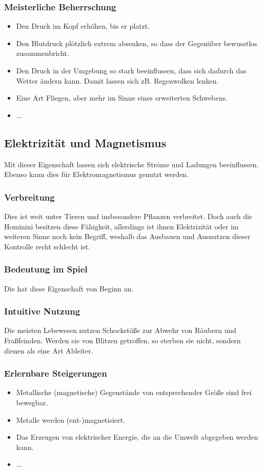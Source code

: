 \subsubsection{Meisterliche Beherrschung} 
\begin{itemize}
	\item Den Druck im Kopf erhöhen, bis er platzt.
	\item Den Blutdruck plötzlich extrem absenken, so dass der Gegenüber bewusstlos zusammenbricht. 
	\item Den Druck in der Umgebung so stark beeinflussen, dass sich dadurch das Wetter ändern kann. Damit lassen sich zB. Regenwolken lenken. 
	\item Eine Art Fliegen, aber mehr im Sinne eines erweiterten Schwebens.
	\item ...
\end{itemize}



\subsection{Elektrizität und Magnetismus}\label{sec:elektromagie}
Mit dieser Eigenschaft lassen sich elektrische Ströme und Ladungen beeinflussen. Ebenso kann dies für Elektromagnetismus genutzt werden.

\subsubsection{Verbreitung}
Dies ist weit unter Tieren und insbesondere Pflanzen verbreitet. Doch auch die Hominini besitzen diese Fähigkeit, allerdings ist ihnen Elektrizität oder im weiteren Sinne noch kein Begriff, weshalb das Ausbauen und Ausnutzen dieser Kontrolle recht schlecht ist.

\subsubsection{Bedeutung im Spiel}
Die  hat diese Eigenschaft von Beginn an. 

\subsubsection{Intuitive Nutzung}
Die meisten Lebewesen nutzen Schockstöße zur Abwehr von Räubern und Fraßfeinden. Werden sie von Blitzen getroffen, so sterben sie nicht, sondern dienen als eine Art Ableiter. 

\subsubsection{Erlernbare Steigerungen}
\begin{itemize}
	\item Metallische (magnetische) Gegenstände von entsprechender Größe sind frei bewegbar.
	\item Metalle werden (ent-)magnetisiert.
	\item Das Erzeugen von elektrischer Energie, die an die Umwelt abgegeben werden kann.
	\item ...
\end{itemize}

